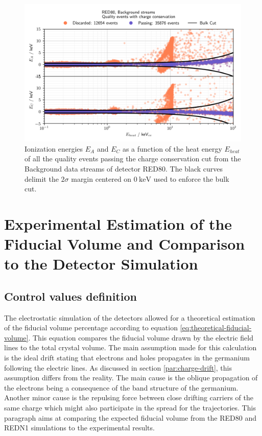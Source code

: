 \begin{figure}
\centering
\includegraphics[scale=1]{Figures/ElectrodesExperimental/bulk_cut.png}
\caption{Ionization energies $E_A$ and $E_C$ as a function of the heat energy $E_{heat}$ of all the quality events passing the charge conservation cut from the Background data streams of detector RED80. The black curves delimit the $2\sigma$ margin centered on $\SI{0}{\kilo\eV}$ used to enforce the bulk cut.}
\label{fig:fiducial-cut}
\end{figure}


\section{Experimental Estimation of the Fiducial Volume and Comparison to the Detector Simulation}

\subsection{Control values definition}

The electrostatic simulation of the detectors allowed for a theoretical estimation of the fiducial volume percentage according to equation \ref{eq:theoretical-fiducial-volume}. This equation compares the fiducial volume drawn by the electric field lines to the total crystal volume. The main assumption made for this calculation is the ideal drift stating that electrons and holes propagates in the germanium following the electric lines. As discussed in section \ref{par:charge-drift}, this assumption differs from the reality. The main cause is the oblique propagation of the electrons being a consequence of the band structure of the germanium. Another minor cause is the repulsing force between close drifting carriers of the same charge which might also participate in the spread for the trajectories. This paragraph aims at comparing the expected fiducial volume from the RED80 and REDN1 simulations to the experimental results.

